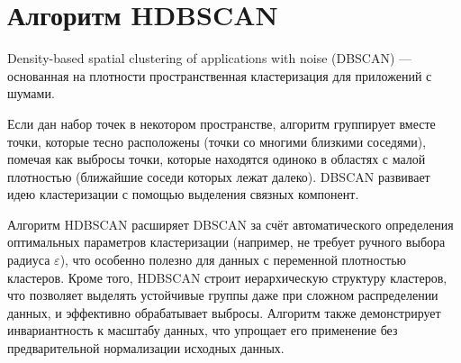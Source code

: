\section{Алгоритм HDBSCAN}

Density-based spatial clustering of applications with noise (DBSCAN) ---
основанная на плотности пространственная кластеризация для
приложений с шумами.

Если дан набор точек в некотором пространстве, алгоритм группирует
вместе точки, которые тесно расположены (точки со многими близкими
соседями), помечая как выбросы точки, которые находятся одиноко в
областях с малой плотностью (ближайшие соседи которых лежат далеко).
DBSCAN развивает идею кластеризации с помощью выделения связных
компонент.

Алгоритм HDBSCAN расширяет DBSCAN за счёт автоматического определения оптимальных параметров кластеризации (например, не требует ручного выбора радиуса $\varepsilon$), что особенно полезно для данных с переменной плотностью кластеров. Кроме того, HDBSCAN строит иерархическую структуру кластеров, что позволяет выделять устойчивые группы даже при сложном распределении данных, и эффективно обрабатывает выбросы. Алгоритм также демонстрирует инвариантность к масштабу данных, что упрощает его применение без предварительной нормализации исходных данных.


\clearpage
